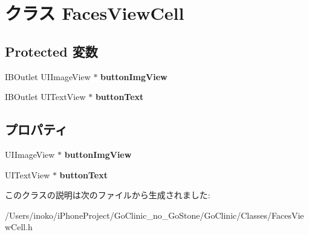 \hypertarget{interface_faces_view_cell}{
\section{クラス FacesViewCell}
\label{interface_faces_view_cell}
}
\subsection*{Protected 変数}
\begin{DoxyCompactItemize}
\item 
\hypertarget{interface_faces_view_cell_a68d26c240de5882b823f220773e97afd}{
IBOutlet UIImageView $\ast$ {\bfseries buttonImgView}}
\label{interface_faces_view_cell_a68d26c240de5882b823f220773e97afd}

\item 
\hypertarget{interface_faces_view_cell_a7d408a245bbc7b1df32c5d8fd3cd153d}{
IBOutlet UITextView $\ast$ {\bfseries buttonText}}
\label{interface_faces_view_cell_a7d408a245bbc7b1df32c5d8fd3cd153d}

\end{DoxyCompactItemize}
\subsection*{プロパティ}
\begin{DoxyCompactItemize}
\item 
\hypertarget{interface_faces_view_cell_a7afecd05db3ddec493a8a8d3bc809a50}{
UIImageView $\ast$ {\bfseries buttonImgView}}
\label{interface_faces_view_cell_a7afecd05db3ddec493a8a8d3bc809a50}

\item 
\hypertarget{interface_faces_view_cell_a8aeb43598062954f04c5bde235a3de0e}{
UITextView $\ast$ {\bfseries buttonText}}
\label{interface_faces_view_cell_a8aeb43598062954f04c5bde235a3de0e}

\end{DoxyCompactItemize}


このクラスの説明は次のファイルから生成されました:\begin{DoxyCompactItemize}
\item 
/Users/inoko/iPhoneProject/GoClinic\_\-no\_\-GoStone/GoClinic/Classes/FacesViewCell.h\end{DoxyCompactItemize}
